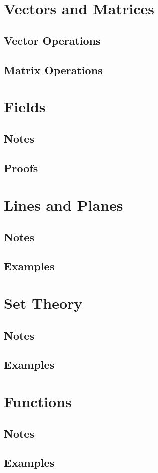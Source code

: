 \section{Vectors and Matrices}
\subsection{Vector Operations}
\subsection{Matrix Operations}
\newpage
\section{Fields}
\subsection{Notes}
\subsection{Proofs}
\newpage
\section{Lines and Planes}
\subsection{Notes}
\subsection{Examples}
\newpage
\section{Set Theory}
\subsection{Notes}
\subsection{Examples}
\newpage
\section{Functions}
\subsection{Notes}
\subsection{Examples}
\newpage
